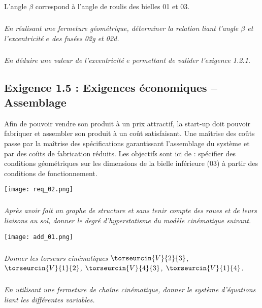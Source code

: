 \begin{multicols}{2}
L’angle $\beta$  correspond à l’angle de roulis des bielles 01 et 03.

\subparagraph{}
\textit{En réalisant une fermeture géométrique, déterminer la relation liant l’angle $\beta$  et l’excentricité $e$ des fusées 02g et 02d.}

\subparagraph{}
\textit{En déduire une valeur de l’excentricité $e$ permettant de valider l’exigence 1.2.1.}

\ifprof
\begin{corrige}
\end{corrige}\else\fi

\newpage

\subsection*{Exigence 1.5 : Exigences économiques -- Assemblage}
\begin{obj}
Afin de pouvoir vendre son produit à un prix attractif, la start-up doit pouvoir fabriquer et assembler son produit à un coût satisfaisant. Une maîtrise des coûts passe par la maîtrise des spécifications garantissant l’assemblage du système et par des coûts de fabrication réduits. Les objectifs sont ici de : spécifier des conditions géométriques sur les dimensions de la bielle inférieure (03) à partir des conditions de fonctionnement.
\end{obj}

\begin{center}
\texttt{[image: req\_02.png]}
\end{center}

\subparagraph{}
\textit{Après avoir fait un graphe de structure et sans tenir compte des roues et de leurs liaisons au sol, donner le degré d’hyperstatisme du modèle cinématique suivant.}

\ifprof
\begin{corrige}
\end{corrige}\else\fi

\begin{center}
\texttt{[image: add\_01.png]}
\end{center}


\subparagraph{}
\textit{Donner les torseurs cinématiques $\torseurcin{V}{2}{3}$, $\torseurcin{V}{1}{2}$, $\torseurcin{V}{4}{3}$, $\torseurcin{V}{1}{4}$.}
\ifprof
\begin{corrige}
\end{corrige}\else\fi


\subparagraph{}
\textit{En utilisant une fermeture de chaîne cinématique, donner le système d’équations liant les différentes variables.}
\ifprof
\begin{corrige}
\end{corrige}\else\fi




\end{multicols}
